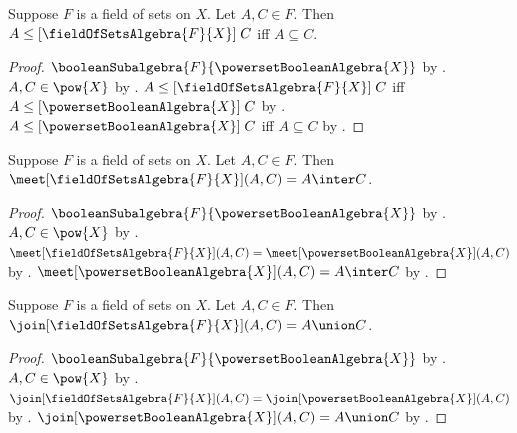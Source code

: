 \begin{proposition}\label{field_of_sets_algebra_order_iff}
    Suppose $F$ is a field of sets on $X$.
    Let $A,C\in F$.
    Then $A\mathrel{\leq[\fieldOfSetsAlgebra{F}{X}]}C$ iff
        $A\subseteq C$.
\end{proposition}
\begin{proof}
    $\booleanSubalgebra{F}{\powersetBooleanAlgebra{X}}$ by
        .
    $A,C\in\pow{X}$ by
        .
    $A\mathrel{\leq[\fieldOfSetsAlgebra{F}{X}]}C$ iff
        $A\mathrel{\leq[\powersetBooleanAlgebra{X}]}C$ by
        .
    $A\mathrel{\leq[\powersetBooleanAlgebra{X}]}C$ iff
        $A\subseteq C$ by
        .
\end{proof}

\begin{proposition}\label{field_of_sets_algebra_meet_apply}
    Suppose $F$ is a field of sets on $X$.
    Let $A,C\in F$.
    Then $\meet[\fieldOfSetsAlgebra{F}{X}](A,C)=A\inter C$.
\end{proposition}
\begin{proof}
    $\booleanSubalgebra{F}{\powersetBooleanAlgebra{X}}$ by
        .
    $A,C\in\pow{X}$ by
        .
    $\meet[\fieldOfSetsAlgebra{F}{X}](A,C)
        =\meet[\powersetBooleanAlgebra{X}](A,C)$ by
        .
    $\meet[\powersetBooleanAlgebra{X}](A,C)=A\inter C$ by
        .
\end{proof}

\begin{proposition}\label{field_of_sets_algebra_join_apply}
    Suppose $F$ is a field of sets on $X$.
    Let $A,C\in F$.
    Then $\join[\fieldOfSetsAlgebra{F}{X}](A,C)=A\union C$.
\end{proposition}
\begin{proof}
    $\booleanSubalgebra{F}{\powersetBooleanAlgebra{X}}$ by
        .
    $A,C\in\pow{X}$ by
        .
    $\join[\fieldOfSetsAlgebra{F}{X}](A,C)
        =\join[\powersetBooleanAlgebra{X}](A,C)$ by
        .
    $\join[\powersetBooleanAlgebra{X}](A,C)=A\union C$ by
        .
\end{proof}

